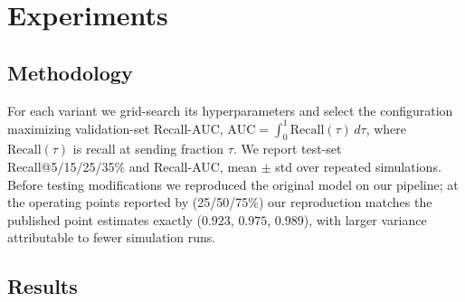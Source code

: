 \section{Experiments}
\label{sec:experiments}

\subsection{Methodology}
\label{sec:methodology}

For each variant we grid-search its hyperparameters and select the
configuration maximizing validation-set Recall-AUC,
$\mathrm{AUC} = \int_0^1 \mathrm{Recall}(\tau)\,d\tau$, where
$\mathrm{Recall}(\tau)$ is recall at sending fraction $\tau$. We report
test-set Recall@5/15/25/35\% and Recall-AUC, mean $\pm$ std over repeated
simulations. Before testing modifications we reproduced the original model
on our pipeline; at the operating points reported by
\citet{zid2025active} (25/50/75\%) our reproduction matches
the published point estimates exactly ($0.923$, $0.975$, $0.989$), with
larger variance attributable to fewer simulation runs.

\subsection{Results}
\label{sec:results}

